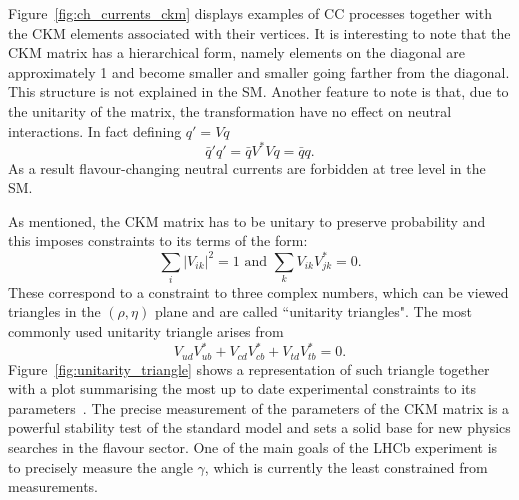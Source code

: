 %
Figure~\ref{fig:ch_currents_ckm} displays examples of CC processes together with the CKM elements associated with their vertices.
It is interesting to note that the CKM matrix has a hierarchical form, namely elements on the diagonal are approximately
1 and become smaller and smaller going farther from the diagonal. This structure is not explained in the SM.
Another feature to note is that, due to the unitarity of the matrix, the transformation have no effect on neutral interactions.
In fact defining $q' = Vq$
%
\begin{equation}
\bar{q}'q' = \bar{q}V^{*}Vq = \bar{q}q.
\end{equation}
%
As a result flavour-changing neutral currents are forbidden at tree level in the SM.

As mentioned, the CKM matrix has to be unitary to preserve probability and this imposes constraints to its terms of the form:
\begin{equation}
\sum_i |V_{ik}|^2 = 1 \text{ and } \sum_k V_{ik} V^{*}_{jk} = 0.
\end{equation}
These correspond to a constraint to three complex numbers, which can be viewed
triangles in the $(\rho,\eta)$ plane and are called ``unitarity triangles".
The most commonly used unitarity triangle arises from
\begin{equation}
V_{ud}V^*_{ub} + V_{cd}V^*_{cb} + V_{td}V^*_{tb}=0.
\end{equation}
Figure~\ref{fig:unitarity_triangle} shows a representation of such triangle together with
a plot summarising the most up to date experimental constraints to its parameters~\cite{Charles:2015gya}.
The precise measurement of the parameters of the CKM matrix
is a powerful stability test of the standard model and sets a solid base for new physics
searches in the flavour sector. One of the main goals of the LHCb experiment is to precisely
measure the angle $\gamma$, which is currently the least constrained from measurements.
